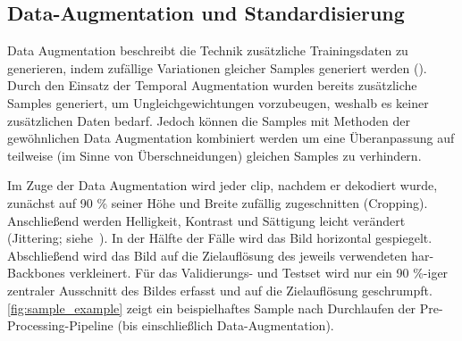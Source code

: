\subsection{Data-Augmentation und Standardisierung}
\label{subsec:data-augmentation}

Data Augmentation beschreibt die Technik zusätzliche Trainingsdaten zu generieren, indem zufällige Variationen gleicher Samples generiert werden (\cite{Gugger20}).
Durch den Einsatz der Temporal Augmentation wurden bereits zusätzliche Samples generiert, um Ungleichgewichtungen vorzubeugen, weshalb es keiner zusätzlichen Daten bedarf.
Jedoch können die Samples mit Methoden der gewöhnlichen Data Augmentation kombiniert werden um eine Überanpassung auf teilweise (im Sinne von Überschneidungen) gleichen Samples zu verhindern.

Im Zuge der Data Augmentation wird jeder \gls{clip}, nachdem er dekodiert wurde, zunächst auf 90 \% seiner Höhe und Breite zufällig zugeschnitten (Cropping).
Anschließend werden Helligkeit, Kontrast und Sättigung leicht verändert (Jittering; siehe~\cite{Tran18}).
In der Hälfte der Fälle wird das Bild horizontal gespiegelt.
Abschließend wird das Bild auf die Zielauflösung des jeweils verwendeten \gls{har}-Backbones verkleinert.
Für das Validierungs- und Testset wird nur ein 90 \%-iger zentraler Ausschnitt des Bildes erfasst und auf die Zielauflösung geschrumpft.
\autoref{fig:sample_example} zeigt ein beispielhaftes Sample nach Durchlaufen der Pre-Processing-Pipeline (bis einschließlich Data-Augmentation).

